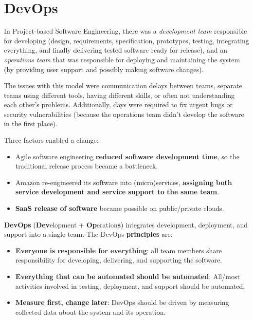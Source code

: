 \chapter{DevOps}

In Project-based Software Engineering, there was a \textit{development team} responsible for developing (design, requirements, specification, prototypes, testing, integrating everything, and finally delivering tested software ready for release), and an \textit{operations team} that was responsible for deploying and maintaining the system (by providing user support and possibly making software changes).

The issues with this model were communication delays between teams, separate teams using different tools, having different skills, or often not understanding each other's problems. Additionally, days were required to fix urgent bugs or security vulnerabilities (because the operations team didn't develop the software in the first place).

\noindent Three factors enabled a change:

\begin{itemize}
    \item Agile software engineering \textbf{reduced software development time}, so the traditional release process became a bottleneck.
    \item Amazon re-engineered its software into (micro)services, \textbf{assigning both service development and service support to the same team}.
    \item \textbf{SaaS release of software} became possible on public/private clouds.
\end{itemize}

\noindent \textbf{DevOps} (\textbf{Dev}elopment + \textbf{Op}eration\textbf{s}) integrates development, deployment, and support into a single team. The DevOps \textbf{principles} are:     
\begin{itemize}
    \item \textbf{Everyone is responsible for everything}: all team members share responsibility for developing, delivering, and supporting the software.
    \item \textbf{Everything that can be automated should be automated}: All/most activities involved in testing, deployment, and support should be automated.
    \item \textbf{Measure first, change later}: DevOps should be driven by measuring collected data about the system and its operation.
\end{itemize}

